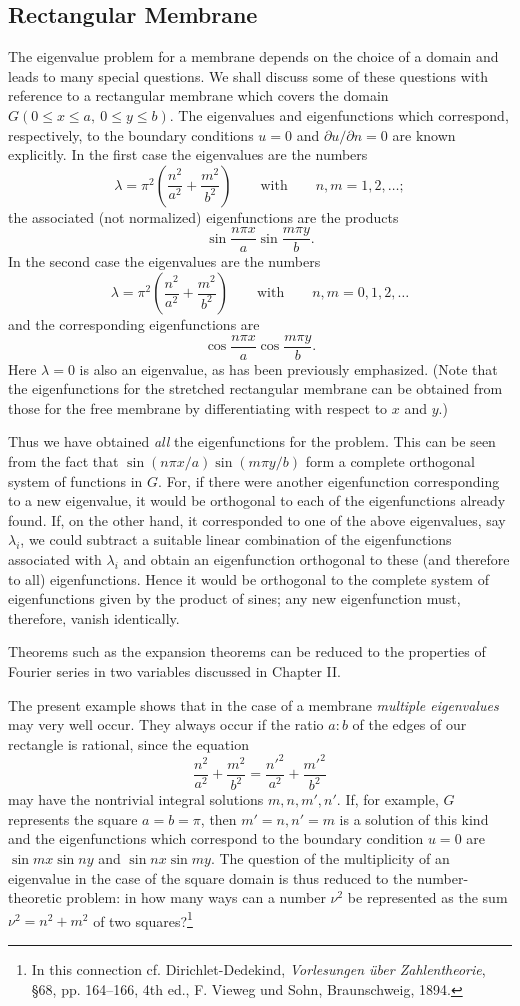 \subsection{Rectangular Membrane}
The eigenvalue problem for a membrane depends on the choice of a domain and leads to many special questions. We shall discuss some of these questions with reference to a rectangular membrane which covers the domain $G(0\le x\le a,\ 0\le y\le b)$. The eigenvalues and eigenfunctions which correspond, respectively, to the boundary conditions $u=0$ and $\partial u/\partial n=0$ are known explicitly. In the first case the eigenvalues are the numbers
\[
\lambda=\pi^2\left(\frac{n^2}{a^2}+\frac{m^2}{b^2}\right)
\qquad\text{with}\qquad n,m=1,2,\ldots;
\]
the associated (not normalized) eigenfunctions are the products
\[
\sin\frac{n\pi x}{a}\sin\frac{m\pi y}{b}.
\]
In the second case the eigenvalues are the numbers
\[
\lambda=\pi^2\left(\frac{n^2}{a^2}+\frac{m^2}{b^2}\right)
\qquad\text{with}\qquad n,m=0,1,2,\ldots
\]
and the corresponding eigenfunctions are
\[
\cos\frac{n\pi x}{a}\cos\frac{m\pi y}{b}.
\]
Here $\lambda=0$ is also an eigenvalue, as has been previously emphasized. (Note that the eigenfunctions for the stretched rectangular membrane can be obtained from those for the free membrane by differentiating with respect to $x$ and $y$.)

Thus we have obtained \emph{all} the eigenfunctions for the problem. This can be seen from the fact that $\sin(n\pi x/a)\sin(m\pi y/b)$ form a complete orthogonal system of functions in $G$. For, if there were another eigenfunction corresponding to a new eigenvalue, it would be orthogonal to each of the eigenfunctions already found. If, on the other hand, it corresponded to one of the above eigenvalues, say $\lambda_i$, we could subtract a suitable linear combination of the eigenfunctions associated with $\lambda_i$ and obtain an eigenfunction orthogonal to these (and therefore to all) eigenfunctions. Hence it would be orthogonal to the complete system of eigenfunctions given by the product of sines; any new eigenfunction must, therefore, vanish identically.

Theorems such as the expansion theorems can be reduced to the properties of Fourier series in two variables discussed in Chapter II.

The present example shows that in the case of a membrane \emph{multiple eigenvalues} may very well occur. They always occur if the ratio $a:b$ of the edges of our rectangle is rational, since the equation
\[
\frac{n^2}{a^2}+\frac{m^2}{b^2}=\frac{n'^2}{a^2}+\frac{m'^2}{b^2}
\]
may have the nontrivial integral solutions $m,n,m',n'$. If, for example, $G$ represents the square $a=b=\pi$, then $m'=n,n'=m$ is a solution of this kind and the eigenfunctions which correspond to the boundary condition $u=0$ are $\sin mx\sin ny$ and $\sin nx\sin my$. The question of the multiplicity of an eigenvalue in the case of the square domain is thus reduced to the number-theoretic problem: in how many ways can a number $\nu^2$ be represented as the sum $\nu^2=n^2+m^2$ of two squares?\footnote{In this connection cf. Dirichlet-Dedekind, \emph{Vorlesungen über Zahlentheorie}, \S68, pp. 164--166, 4th ed., F. Vieweg und Sohn, Braunschweig, 1894.}

